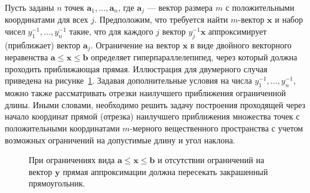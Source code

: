 \documentclass[specialist,
               substylefile = spbu.rtx,
               subf,href,colorlinks=true, 12pt]{disser}
\theoremstyle{definition}
\begin{document}
Пусть заданы $n$ точек $\bm{a}_{1},\ldots,\bm{a}_{n}$, где $\bm{a}_{j}$ --- вектор размера $m$ с положительными координатами для всех $j$.
Предположим, что требуется найти $m$-вектор $\bm{x}$ и набор чисел $y_{1}^{-1},\ldots,y_{n}^{-1}$ такие, что для каждого $j$ вектор $y_{j}^{-1}\bm{x}$ аппроксимирует (приближает) вектор $\bm{a}_{j}$.
Ограничение на вектор $\bm{x}$ в виде двойного векторного неравенства $\bm{a}\leq\bm{x}\leq\bm{b}$ определяет гиперпараллелепипед, через который должна проходить приближающая прямая. Иллюстрация  для двумерного случая приведена на рисунке~\ref{fig:constraints_for_x}.
Задавая дополнительные условия на числа $y_{1}^{-1},\ldots,y_{n}^{-1}$, можно также рассматривать отрезки наилучшего приближения ограниченной длины.
Иными словами, необходимо решить задачу построения проходящей через начало координат прямой (отрезка) наилучшего приближения множества точек с положительными координатами $m$-мерного вещественного пространства с учетом возможных ограничений на допустимые длину и угол наклона. %
\begin{figure}[h]
\caption{При ограничениях вида $\bm{a}\leq\bm{x}\leq\bm{b}$ и отсутствии ограничений на вектор $\bm{y}$ прямая аппроксимации должна пересекать закрашенный прямоугольник.}
\label{fig:constraints_for_x}
\end{figure}
\end{document}
